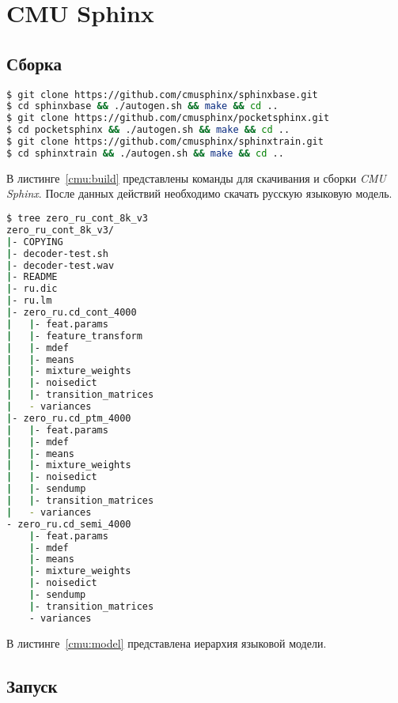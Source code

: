 \section{CMU Sphinx}
\subsection{Сборка}

\begin{minipage}{\linewidth}

\begin{lstlisting}[caption={Клонирование и сборка необходимых интсрументов},label={cmu:build},language=bash]
$ git clone https://github.com/cmusphinx/sphinxbase.git
$ cd sphinxbase && ./autogen.sh && make && cd ..
$ git clone https://github.com/cmusphinx/pocketsphinx.git
$ cd pocketsphinx && ./autogen.sh && make && cd ..
$ git clone https://github.com/cmusphinx/sphinxtrain.git
$ cd sphinxtrain && ./autogen.sh && make && cd ..
\end{lstlisting}

\end{minipage}
В листинге~\ref{cmu:build} представлены команды для скачивания и сборки \textit{CMU Sphinx}.
После данных действий необходимо скачать русскую языковую модель.

\begin{minipage}{\linewidth}

\begin{lstlisting}[caption={Иерархия языковой модели},label={cmu:model},language=bash]
$ tree zero_ru_cont_8k_v3
zero_ru_cont_8k_v3/
|- COPYING
|- decoder-test.sh
|- decoder-test.wav
|- README
|- ru.dic
|- ru.lm
|- zero_ru.cd_cont_4000
|   |- feat.params
|   |- feature_transform
|   |- mdef
|   |- means
|   |- mixture_weights
|   |- noisedict
|   |- transition_matrices
|   - variances
|- zero_ru.cd_ptm_4000
|   |- feat.params
|   |- mdef
|   |- means
|   |- mixture_weights
|   |- noisedict
|   |- sendump
|   |- transition_matrices
|   - variances
- zero_ru.cd_semi_4000
    |- feat.params
    |- mdef
    |- means
    |- mixture_weights
    |- noisedict
    |- sendump
    |- transition_matrices
    - variances
\end{lstlisting}
\end{minipage}

В листинге~\ref{cmu:model} представлена иерархия языковой модели.

\subsection{Запуск}

